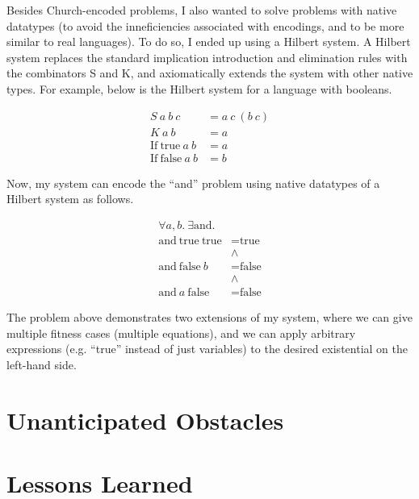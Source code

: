 \documentclass{article}
\newcommand{\n}[1]{\textrm{#1}}
\begin{document}
Besides Church-encoded problems, I also wanted to solve problems with
native datatypes (to avoid the inneficiencies associated with
encodings, and to be more similar to real languages).
To do so, I ended up using a Hilbert system. A Hilbert system replaces
the standard implication introduction and elimination rules with the
combinators S and K, and axiomatically extends the system with other
native types. For example, below is the Hilbert system for a language
with booleans.

\begin{align*}
S ~ a ~ b ~ c &= a ~ c ~ (b ~ c)\\
K ~ a ~ b &= a\\
\n{If} ~ \n{true} ~ a ~ b &= a\\
\n{If} ~ \n{false} ~ a ~ b &= b
\end{align*}

Now, my system can encode the ``and'' problem using native datatypes of a
Hilbert system as follows.

\begin{align*}
\forall a,b . ~ \exists \n{and} .\\
\n{and} ~ \n{true} ~ \n{true} &= \n{true}\\
&\land\\
\n{and} ~ \n{false} ~ b &= \n{false}\\
&\land\\
\n{and} ~ a ~ \n{false} &= \n{false}
\end{align*}

The problem above demonstrates two extensions of my system, where we
can give multiple fitness cases (multiple equations), and we can apply
arbitrary expressions (e.g. ``true'' instead of just variables) to the
desired existential on the left-hand side.





\section{Unanticipated Obstacles}

\section{Lessons Learned}
\end{document}

